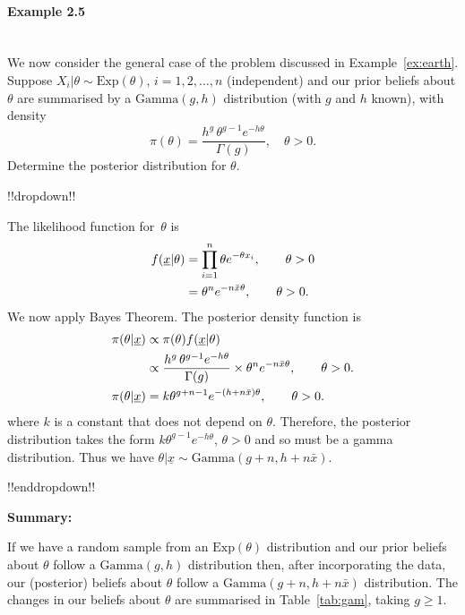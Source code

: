 \paragraph{Example 2.5}{~\\
  We now consider the general case of the problem discussed in Example~\ref{ex:earth}.  Suppose $X_i|\theta\sim \mathrm{Exp}(\theta)$, $i=1,2,\ldots,n$ (independent) and our prior beliefs about $\theta$ are summarised by a $\mathrm{Gamma}(g,h)$ distribution (with $g$ and $h$ known), with density
\begin{equation}
\label{eq:p6}
\pi(\theta)=\frac{h^g\,\theta^{g-1}e^{-h\theta}}{\Gamma(g)}, 
\quad\theta>0.
\end{equation}
Determine the posterior distribution for $\theta$.

!!dropdown!!

The likelihood function for~$\theta$ is
    \begin{align}
    \label{eq:p7}
   f(\underline{x}|\theta)&=\prod_{i=1}^n \theta e^{-\theta x_i}, 
    \quad\quad\theta>0 \notag \\
    &= \theta^n e^{-n\bar x\theta}, \quad\quad\theta>0. 
    \end{align}
    We now apply Bayes Theorem. The posterior density function is
    \begin{align}
    \pi(\theta|\underline{x})&\propto\pi(\theta)f(\underline{x}|\theta) \notag \\
    &\propto\frac{h^g\,\theta^{g-1}e^{-h\theta}}{\Gamma(g)}\times
    \theta^n e^{-n\bar x\theta},\quad\quad\theta>0. \notag \\
    \pi(\theta|\underline{x})
    \label{eq:p8}
    &=k\theta^{g+n-1}e^{-(h+n\bar x)\theta},\quad\quad\theta>0.
    \end{align}
    where $k$ is a constant that does not depend on $\theta$. Therefore, the posterior distribution takes the form $k\theta^{g-1}e^{-h\theta}$, $\theta>0$ and so must be a gamma distribution. Thus we have $\theta|\underline{x}\sim \mathrm{Gamma}(g+n,h+n\bar x)$.

!!enddropdown!!



\textbf{Summary:} 

If we have a random sample from an $\mathrm{Exp}(\theta)$ distribution and our prior beliefs about $\theta$ follow a $\mathrm{Gamma}(g,h)$ distribution then, after incorporating the data, our (posterior) beliefs about $\theta$ follow a $\mathrm{Gamma}(g+n,h+n\bar x)$ distribution.
The changes in our beliefs about $\theta$ are summarised in Table~\ref{tab:gam}, taking $g\geq 1$.
\begin{table}[!h]
\bigskip


\end{table}}
